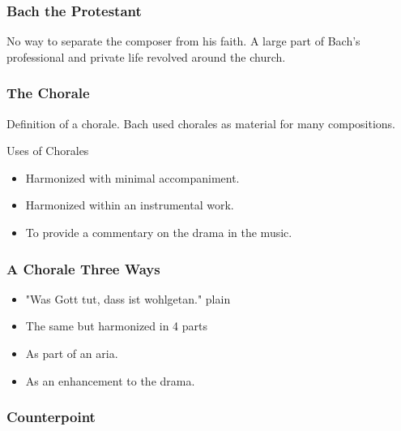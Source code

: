 	\begin{frame}
		\frametitle{Bach the Protestant}
		No way to separate the composer from his faith.
		A large part of Bach's professional and private life revolved around the church.
	\end{frame}
	
	\begin{frame}
		\frametitle{The Chorale}
		Definition of a chorale.
		Bach used chorales as material for many compositions.
		
		\begin{block}{Uses of Chorales}
			\begin{itemize}
				\item Harmonized with minimal accompaniment.
				\item Harmonized within an instrumental work.
				\item To provide a commentary on the drama in the music.
			\end{itemize}
		\end{block}
	\end{frame}
	
	\begin{frame}
		\frametitle{A Chorale Three Ways}
			\begin{itemize}
				\item "Was Gott tut, dass ist wohlgetan." plain
				\item The same but harmonized in 4 parts
				\item As part of an aria.
				\item As an enhancement to the drama.
			\end{itemize}
	\end{frame}
	
	\begin{frame}
		\frametitle{Counterpoint}
	\end{frame}
	
	